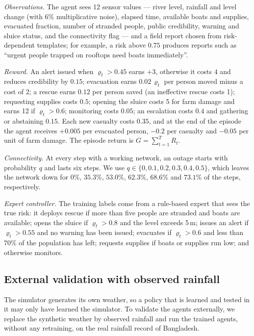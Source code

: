 \documentclass[journal]{IEEEtran}
\begin{document}
\textit{Observations.} The agent sees 12 sensor values --- river level,
rainfall and level change (with $6\%$ multiplicative noise), elapsed time,
available boats and supplies, evacuated fraction, number of stranded people,
public credibility, warning and sluice status, and the connectivity flag ---
and a field report chosen from risk-dependent templates; for example, a risk
above $0.75$ produces reports such as ``urgent people trapped on rooftops need
boats immediately''.

\textit{Reward.} An alert issued when $\varrho_t>0.45$ earns $+3$, otherwise it
costs $4$ and reduces credibility by $0.15$; evacuation earns
$0.02\,\varrho_t$ per person moved minus a cost of 2; a rescue earns $0.12$ per
person saved (an ineffective rescue costs 1); requesting supplies costs $0.5$; opening the sluice costs 5 for
farm damage and earns 12 if $\varrho_t>0.6$; monitoring costs $0.05$; an
escalation costs $0.4$ and gathering or abstaining $0.15$. Each new casualty
costs $0.35$, and at the end of the episode the agent receives
$+0.005$ per evacuated person, $-0.2$ per casualty and $-0.05$ per unit of farm
damage. The episode return is $G=\sum_{t=1}^{T}R_t$.

\textit{Connectivity.} At every step with a working network, an outage starts
with probability $q$ and lasts six steps. We use
$q\in\{0,0.1,0.2,0.3,0.4,0.5\}$, which leaves the network down for $0\%$,
$35.3\%$, $53.0\%$, $62.3\%$, $68.6\%$ and $73.1\%$ of the steps, respectively.

\textit{Expert controller.} The training labels come from a rule-based expert
that sees the true risk: it deploys rescue if more than five people are
stranded and boats are available; opens the sluice if $\varrho_t>0.8$ and the
level exceeds 5\,m; issues an alert if $\varrho_t>0.55$ and no warning has been
issued; evacuates if $\varrho_t>0.6$ and less than $70\%$ of the population has
left; requests supplies if boats or supplies run low; and otherwise monitors.

\subsection{External validation with observed rainfall}\label{sec:extmethod}
The simulator generates its own weather, so a policy that is learned and
tested in it may only have learned the simulator. To validate the agents
externally, we replace the synthetic weather by observed rainfall and run the
trained agents, without any retraining, on the real rainfall record of
Bangladesh.
\end{document}
